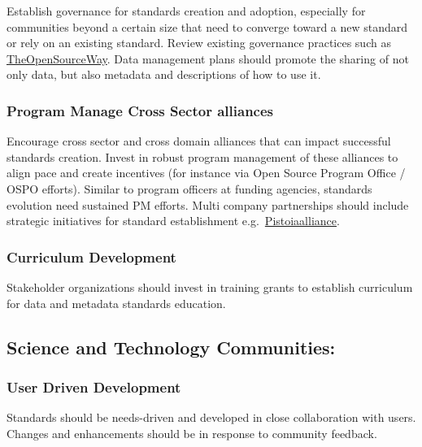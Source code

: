 \documentclass[
  letterpaper,
  DIV=11,
  numbers=noendperiod]{scrartcl}
\begin{document}
Establish governance for standards creation and adoption, especially for
communities beyond a certain size that need to converge toward a new
standard or rely on an existing standard. Review existing governance
practices such as
\href{https://www.theopensourceway.org/the_open_source_way-guidebook-2.0.html\#_project_and_community_governance}{TheOpenSourceWay}.
Data management plans should promote the sharing of not only data, but
also metadata and descriptions of how to use it.

\subsubsection{Program Manage Cross Sector
alliances}\label{program-manage-cross-sector-alliances}

Encourage cross sector and cross domain alliances that can impact
successful standards creation. Invest in robust program management of
these alliances to align pace and create incentives (for instance via
Open Source Program Office / OSPO efforts). Similar to program officers
at funding agencies, standards evolution need sustained PM efforts.
Multi company partnerships should include strategic initiatives for
standard establishment
e.g.~\href{https://www.pistoiaalliance.org/news/press-release-pistoia-alliance-launches-idmp-1-0/}{Pistoiaalliance}.

\subsubsection{Curriculum Development}\label{curriculum-development}

Stakeholder organizations should invest in training grants to establish
curriculum for data and metadata standards education.

\subsection{Science and Technology
Communities:}\label{science-and-technology-communities}

\subsubsection{User Driven Development}\label{user-driven-development}

Standards should be needs-driven and developed in close collaboration
with users. Changes and enhancements should be in response to community
feedback.
\end{document}
